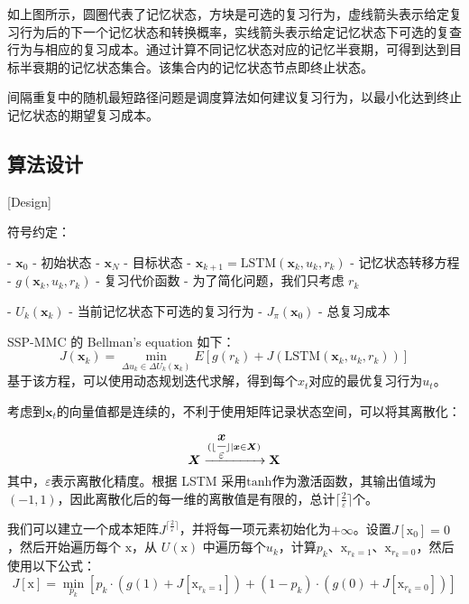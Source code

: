 如上图所示，圆圈代表了记忆状态，方块是可选的复习行为，虚线箭头表示给定复习行为后的下一个记忆状态和转换概率，实线箭头表示给定记忆状态下可选的复查行为与相应的复习成本。通过计算不同记忆状态对应的记忆半衰期，可得到达到目标半衰期的记忆状态集合。该集合内的记忆状态节点即终止状态。

间隔重复中的随机最短路径问题是调度算法如何建议复习行为，以最小化达到终止记忆状态的期望复习成本。

\subsection{算法设计}[Design]

符号约定：

- $\boldsymbol x_0$ - 初始状态
- $\boldsymbol x_{N}$ - 目标状态
- $\boldsymbol x_{k+1} = \mathrm{LSTM}(\boldsymbol x_k,u_k,r_k)$ - 记忆状态转移方程
- $g(\boldsymbol x_k,u_k,r_k)$ - 复习代价函数
  - 为了简化问题，我们只考虑 $r_k$

- $U_k(\boldsymbol x_k)$ - 当前记忆状态下可选的复习行为
- $J_\pi(\boldsymbol x_0)$ - 总复习成本

SSP-MMC 的 Bellman's equation 如下：
\begin{equation}
J(\boldsymbol x_k) = \min\limits_{\Delta u_k \in \Delta U_k(\boldsymbol x_k)} E[g(r_k) + J(\mathrm{LSTM}(\boldsymbol x_k,u_k,r_k))]
\end{equation}
基于该方程，可以使用动态规划迭代求解，得到每个$x_t$对应的最优复习行为$u_t$。

考虑到$\boldsymbol x_t$的向量值都是连续的，不利于使用矩阵记录状态空间，可以将其离散化：
\begin{equation}
\boldsymbol X \xrightarrow[]{(\lfloor \cfrac{\boldsymbol x}{\varepsilon} \rfloor|\boldsymbol x \in \boldsymbol X)} \boldsymbol{\mathrm{X}}
\end{equation}
其中，$\varepsilon$表示离散化精度。根据 LSTM 采用$\mathrm{tanh}$作为激活函数，其输出值域为$(-1,1)$，因此离散化后的每一维的离散值是有限的，总计$\lceil\frac{2}{\varepsilon}\rceil$个。

我们可以建立一个成本矩阵$J^{\lceil\frac{2}{\varepsilon}\rceil}$，并将每一项元素初始化为$+\infty$。设置$J[\boldsymbol{\mathrm{x_0}}] = 0$，然后开始遍历每个 $\boldsymbol{\mathrm{x}}$，从 $U(\boldsymbol{\mathrm{x}})$ 中遍历每个$u_k$，计算$p_k$、$\boldsymbol{\mathrm{x}}_{r_k=1}$、$\boldsymbol{\mathrm{x}}_{r_k=0}$，然后使用以下公式：
\begin{equation}
J[\boldsymbol{\mathrm{x}}] = \min\limits_{p_k} [p_k \cdot (g(1) + J[\boldsymbol{\mathrm{x}}_{r_k=1}]) + (1-p_k) \cdot (g(0) + J[\boldsymbol{\mathrm{x}}_{r_k=0}])]
\end{equation}

